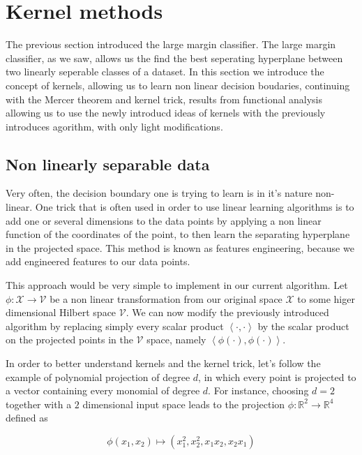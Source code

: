 \section{Kernel methods}

The previous section introduced the large margin classifier. The large margin classifier, as we saw, allows us the find the best seperating hyperplane between two linearly seperable classes of a dataset. In this section we introduce the concept of kernels, allowing us to learn non linear decision boudaries, continuing with the Mercer theorem and kernel trick, results from functional analysis allowing us to use the newly introducd ideas of kernels with the previously introduces agorithm, with only light modifications.

\subsection{Non linearly separable data}

Very often, the decision boundary one is trying to learn is in it's nature non-linear. One trick that is often used in order to use linear learning algorithms is to add one or several dimensions to the data points by applying a non linear function of the coordinates of the point, to then learn the separating hyperplane in the projected space. This method is known as features engineering, because we add engineered features to our data points.


This approach would be very simple to implement in our current algorithm. Let $\phi : \mathcal{X} \rightarrow \mathcal{V}$ be a non linear transformation from our original space $\mathcal{X}$ to some higer dimensional Hilbert space $\mathcal{V}$. We can now modify the previously introduced algorithm by replacing simply every scalar product $\left<\cdot , \cdot\right>$ by the scalar product on the projected points in the $\mathcal{V}$ space, namely $\left<\phi(\cdot), \phi(\cdot)\right>$.


In order to better understand kernels and the kernel trick, let's follow the example of polynomial projection of degree $d$, in which every point is projected to a vector containing every monomial of degree $d$. For instance, choosing $d = 2$ together with a $2$ dimensional input space leads to the projection $\phi : \mathbb{R}^2 \rightarrow \mathbb{R}^4$ defined as

\begin{equation*}
    \phi(x_1, x_2) \mapsto (x_1^2, x_2^2, x_1x_2, x_2x_1)
\end{equation*}

